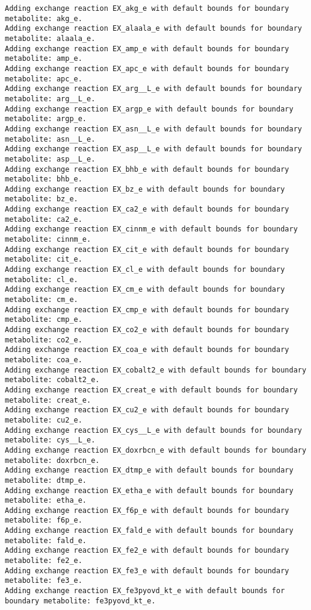 \documentclass[
  letterpaper,
  DIV=11,
  numbers=noendperiod]{scrartcl}
\begin{document}
\begin{verbatim}
Adding exchange reaction EX_akg_e with default bounds for boundary metabolite: akg_e.
Adding exchange reaction EX_alaala_e with default bounds for boundary metabolite: alaala_e.
Adding exchange reaction EX_amp_e with default bounds for boundary metabolite: amp_e.
Adding exchange reaction EX_apc_e with default bounds for boundary metabolite: apc_e.
Adding exchange reaction EX_arg__L_e with default bounds for boundary metabolite: arg__L_e.
Adding exchange reaction EX_argp_e with default bounds for boundary metabolite: argp_e.
Adding exchange reaction EX_asn__L_e with default bounds for boundary metabolite: asn__L_e.
Adding exchange reaction EX_asp__L_e with default bounds for boundary metabolite: asp__L_e.
Adding exchange reaction EX_bhb_e with default bounds for boundary metabolite: bhb_e.
Adding exchange reaction EX_bz_e with default bounds for boundary metabolite: bz_e.
Adding exchange reaction EX_ca2_e with default bounds for boundary metabolite: ca2_e.
Adding exchange reaction EX_cinnm_e with default bounds for boundary metabolite: cinnm_e.
Adding exchange reaction EX_cit_e with default bounds for boundary metabolite: cit_e.
Adding exchange reaction EX_cl_e with default bounds for boundary metabolite: cl_e.
Adding exchange reaction EX_cm_e with default bounds for boundary metabolite: cm_e.
Adding exchange reaction EX_cmp_e with default bounds for boundary metabolite: cmp_e.
Adding exchange reaction EX_co2_e with default bounds for boundary metabolite: co2_e.
Adding exchange reaction EX_coa_e with default bounds for boundary metabolite: coa_e.
Adding exchange reaction EX_cobalt2_e with default bounds for boundary metabolite: cobalt2_e.
Adding exchange reaction EX_creat_e with default bounds for boundary metabolite: creat_e.
Adding exchange reaction EX_cu2_e with default bounds for boundary metabolite: cu2_e.
Adding exchange reaction EX_cys__L_e with default bounds for boundary metabolite: cys__L_e.
Adding exchange reaction EX_doxrbcn_e with default bounds for boundary metabolite: doxrbcn_e.
Adding exchange reaction EX_dtmp_e with default bounds for boundary metabolite: dtmp_e.
Adding exchange reaction EX_etha_e with default bounds for boundary metabolite: etha_e.
Adding exchange reaction EX_f6p_e with default bounds for boundary metabolite: f6p_e.
Adding exchange reaction EX_fald_e with default bounds for boundary metabolite: fald_e.
Adding exchange reaction EX_fe2_e with default bounds for boundary metabolite: fe2_e.
Adding exchange reaction EX_fe3_e with default bounds for boundary metabolite: fe3_e.
Adding exchange reaction EX_fe3pyovd_kt_e with default bounds for boundary metabolite: fe3pyovd_kt_e.

\end{verbatim}
\end{document}
